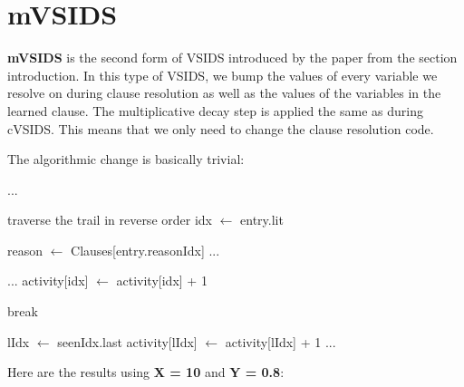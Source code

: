 \section{mVSIDS}

\textbf{mVSIDS} is the second form of VSIDS introduced by the paper from 
the section introduction. In this type of VSIDS, we bump the values of 
every variable we resolve on during clause resolution as well as the values 
of the variables in the learned clause. The multiplicative decay step is 
applied the same as during cVSIDS. This means that we only need to change the
clause resolution code.

The algorithmic change is basically trivial:

\begin{algorithm}[H]
\caption{mVSIDS First UIP resolution}\label{alg:38}
\begin{algorithmic}[1]

\State ...

 \Comment traverse the trail in reverse order
    \State idx $\gets$ entry.lit
    
        \State reason $\gets$ Clauses[entry.reasonIdx]
            \State ...
        \EndFor

        \State ...
        \State activity[idx] $\gets$ activity[idx] + 1
    \EndIf

        \State break
    \EndIf
\EndFor

    \State lIdx $\gets$ seenIdx.last 
    \State activity[lIdx] $\gets$ activity[lIdx] + 1
    \State ...
\EndWhile

\EndProcedure
\end{algorithmic}
\end{algorithm}

\noindent 
Here are the results using \textbf{X = 10} and \textbf{Y = 0.8}:

